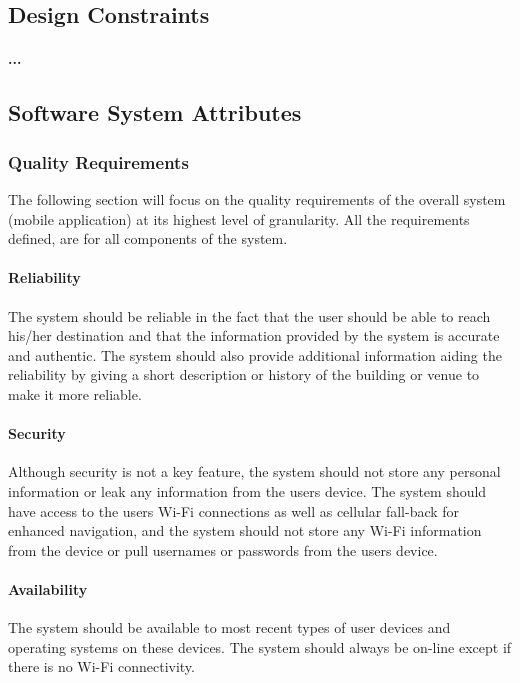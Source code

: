 \documentclass[runningheads,a4paper]{llncs}
\begin{document}
\subsection{Design Constraints}
\paragraph{...}

 \subsection{Software System Attributes}
\subsubsection{Quality Requirements \\}
The following section will focus on the quality requirements of the overall system (mobile application) at its highest level of granularity. All the requirements defined, are for all components of the system.

\paragraph{Reliability \\}
The system should be reliable in the fact that the user should be able to reach his/her destination and that the information provided by the system is accurate and authentic. The system should also provide additional information aiding the reliability by giving a short description or history of the building or venue to make it more reliable. 

\paragraph{Security \\}
Although security is not a key feature, the system should not store any personal information or leak any information from the users device. The system should have access to the users Wi-Fi connections as well as cellular fall-back for enhanced navigation, and the system should not store any Wi-Fi information from the device or pull usernames or passwords from the users device. 

\paragraph{Availability \\}
 The system should be available to most recent types of user devices and operating systems on these devices. The system should always be on-line except if there is no Wi-Fi connectivity.
\end{document}
